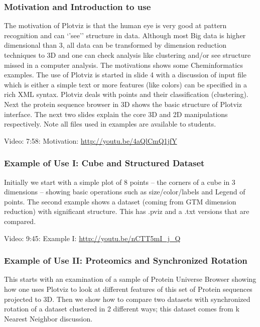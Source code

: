 \subsubsection{Motivation and Introduction to
use}\label{motivation-and-introduction-to-use}

The motivation of Plotviz is that the human eye is very good at pattern
recognition and can `'see'' structure in data. Although most Big data is
higher dimensional than 3, all data can be transformed by dimension
reduction techniques to 3D and one can check analysis like clustering
and/or see structure missed in a computer analysis. The motivations
shows some Cheminformatics examples. The use of Plotviz is started in
slide 4 with a discussion of input file which is either a simple text or
more features (like colors) can be specified in a rich XML syntax.
Plotviz deals with points and their classification (clustering). Next
the protein sequence browser in 3D shows the basic structure of Plotviz
interface. The next two slides explain the core 3D and 2D manipulations
respectively. Note all files used in examples are available to students.

Video: 7:58: Motivation: \url{http://youtu.be/4aQlCmQ1jfY}

\subsubsection{Example of Use I: Cube and Structured
Dataset}\label{example-of-use-i-cube-and-structured-dataset}

Initially we start with a simple plot of 8 points -- the corners of a
cube in 3 dimensions -- showing basic operations such as
size/color/labels and Legend of points. The second example shows a
dataset (coming from GTM dimension reduction) with significant
structure. This has .pviz and a .txt versions that are compared.

Video: 9:45: Example I: \url{http://youtu.be/nCTT5mI_j_Q}

\subsubsection{Example of Use II: Proteomics and Synchronized
Rotation}\label{example-of-use-ii-proteomics-and-synchronized-rotation}

This starts with an examination of a sample of Protein Universe Browser
showing how one uses Plotviz to look at different features of this set
of Protein sequences projected to 3D. Then we show how to compare two
datasets with synchronized rotation of a dataset clustered in 2
different ways; this dataset comes from k Nearest Neighbor discussion.

